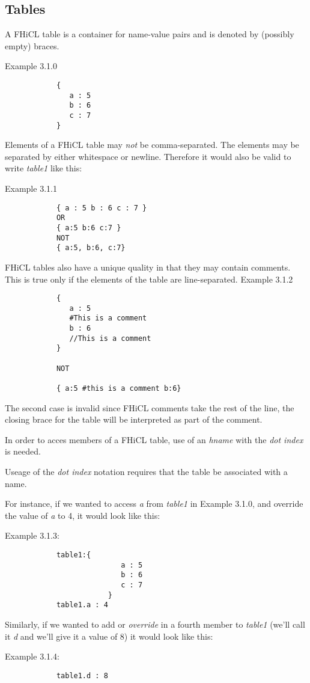 \documentclass{article}
\begin{document}
	\subsection{Tables}
		A FHiCL table is a container for name-value pairs
		and is denoted by (possibly empty) braces.
		\par
		Example 3.1.0
		\begin{verbatim}
			{
			   a : 5
			   b : 6
			   c : 7
			}
		\end{verbatim}
		\par
		Elements of a FHiCL table may \emph{not} be comma-separated.
		The elements may be separated by either whitespace or newline.
		Therefore it would also be valid to write \emph{table1} like this:
		\par
		Example 3.1.1
		\begin{verbatim}
			{ a : 5 b : 6 c : 7 }
			OR
			{ a:5 b:6 c:7 }
			NOT
			{ a:5, b:6, c:7}
		\end{verbatim}
		\par
		FHiCL tables also have a unique quality in that they may contain comments.
		This is true only if the elements of the table are line-separated.
		Example 3.1.2
		\begin{verbatim}
			{
			   a : 5
			   #This is a comment
			   b : 6
			   //This is a comment
			}

			NOT

			{ a:5 #this is a comment b:6}
		\end{verbatim}
		\par
		The second case is invalid since FHiCL comments take the rest of the line,
		the closing brace for the table will be interpreted as part of the comment.
		\par
		In order to acces members of a FHiCL table, use of an \emph{hname}
		with the \emph{dot index} is needed.
		\par
		Useage of the \emph{dot index} notation requires that the table be associated with a name.
		\par
		For instance, if we wanted to access \emph{a} from \emph{table1} in Example 3.1.0,
		and override the value of \emph{a} to 4, it would look like this:
		\par
		Example 3.1.3:
		\begin{verbatim}
			table1:{
                           a : 5
                           b : 6
                           c : 7
                        }
			table1.a : 4
		\end{verbatim}
		\par
		Similarly, if we wanted to add or \emph{override} in a fourth member to \emph{table1}
		(we'll call it \emph{d} and we'll give it a value of 8)
		it would look like this:
		\par
		Example 3.1.4:
		\begin{verbatim}
			table1.d : 8
		\end{verbatim}
		\par
\end{document}
